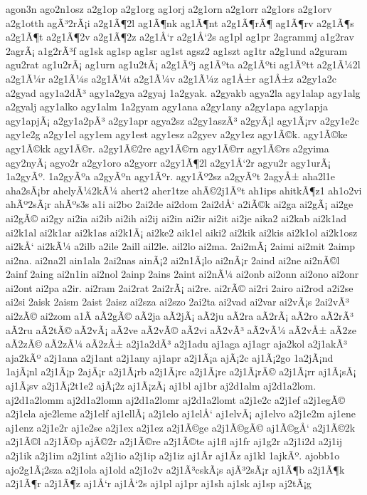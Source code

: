 {agon3n
ago2n1osz
a2g1op
a2g1org
ag1orj
a2g1orn
a2g1orr
a2g1ors
a2g1orv
a2g1otth
agÃ³2rÃ¡i
a2g1Ã¶2l
ag1Ã¶nk
ag1Ã¶nt
a2g1Ã¶rÃ¶
ag1Ã¶rv
a2g1Ã¶s
a2g1Ã¶t
a2g1Ã¶2v
a2g1Ã¶2z
a2g1Å‘r
a2g1Å‘2s
ag1pl
ag1pr
2agrammj
a1g2rav
2agrÃ¡
a1g2rÃ³f
ag1sk
ag1sp
ag1sr
ag1st
agsz2
ag1szt
ag1tr
a2g1und
a2guram
agu2rat
ag1u2rÃ¡
ag1urn
ag1u2tÃ¡
a2g1Ãºj
ag1Ãºta
a2g1Ãºti
ag1Ãºtt
a2g1Ã¼2l
a2g1Ã¼r
a2g1Ã¼s
a2g1Ã¼t
a2g1Ã¼v
a2g1Ã¼z
ag1Å±r
ag1Å±z
a2gy1a2c
a2gyad
agy1a2dÃ³
agy1a2gya
a2gyaj
1a2gyak.
a2gyakb
agya2la
agy1alap
agy1alg
a2gyalj
agy1alko
agy1alm
1a2gyam
agy1ana
a2gy1any
a2gy1apa
agy1apja
agy1apjÃ¡
a2gy1a2pÃ³
a2gy1apr
agya2sz
a2gy1aszÃ³
a2gyÃ¡l
agy1Ã¡rv
a2gy1e2c
agy1e2g
a2gy1el
agy1em
agy1est
agy1esz
a2gyev
a2gy1ez
agy1Ã©k.
agy1Ã©ke
agy1Ã©kk
agy1Ã©r.
a2gy1Ã©2re
agy1Ã©rn
agy1Ã©rr
agy1Ã©rs
a2gyima
agy2nyÃ¡
agyo2r
a2gy1oro
a2gyorr
a2gy1Ã¶2l
a2gy1Å‘2r
agyu2r
agy1urÃ¡
1a2gyÃº.
1a2gyÃºa
a2gyÃºn
agy1Ãºr.
agy1Ãº2sz
a2gyÃºt
2agyÅ±
aha2l1e
aha2sÃ¡br
ahelyÃ¼2kÃ¼
ahert2
aher1tze
ahÃ©2j1Ãºt
ah1ips
ahitkÃ¶z1
ah1o2vi
ahÃº2sÃ¡r
ahÃºs3s
a1i
ai2bo
2ai2de
ai2dom
2ai2dÅ‘
a2iÃ©k
ai2ga
ai2gÃ¡
ai2ge
ai2gÃ©
ai2gy
ai2ia
ai2ib
ai2ih
ai2ij
ai2in
ai2ir
ai2it
ai2je
aika2
ai2kab
ai2k1ad
ai2k1al
ai2k1ar
ai2k1as
ai2k1Ã¡
ai2ke2
aik1el
aiki2
ai2kik
ai2kis
ai2k1ol
ai2k1osz
ai2kÅ‘
ai2kÃ¼
a2ilb
a2ile
2aill
ail2le.
ail2lo
ai2ma.
2ai2mÃ¡
2aimi
ai2mit
2aimp
ai2na.
ai2na2l
ain1ala
2ai2nas
ainÃ¡2
ai2n1Ã¡lo
ai2nÃ¡r
2aind
ai2ne
ai2nÃ©l
2ainf
2aing
ai2n1in
ai2nol
2ainp
2ains
2aint
ai2nÃ¼
ai2onb
ai2onn
ai2ono
ai2onr
ai2ont
ai2pa
a2ir.
ai2ram
2ai2rat
2ai2rÃ¡
ai2re.
ai2rÃ©
ai2ri
2airo
ai2rod
a2i2se
ai2si
2aisk
2aism
2aist
2aisz
ai2sza
ai2szo
2ai2ta
ai2vad
ai2var
ai2vÃ¡s
2ai2vÃ³
ai2zÃ©
ai2zom
a1Ã­
aÃ­2gÃ©
aÃ­2ja
aÃ­2jÃ¡
aÃ­2ju
aÃ­2ra
aÃ­2rÃ¡
aÃ­2ro
aÃ­2rÃ³
aÃ­2ru
aÃ­2tÃ©
aÃ­2vÃ¡
aÃ­2ve
aÃ­2vÃ©
aÃ­2vi
aÃ­2vÃ³
aÃ­2vÃ¼
aÃ­2vÅ±
aÃ­2ze
aÃ­2zÃ©
aÃ­2zÃ¼
aÃ­2zÅ±
a2j1a2dÃ³
a2j1adu
aj1aga
aj1agr
aja2kol
a2j1akÃ³
aja2kÃº
a2j1ana
a2j1ant
a2j1any
aj1apr
a2j1Ã¡a
ajÃ¡2c
aj1Ã¡2go
1a2jÃ¡nd
1ajÃ¡nl
a2j1Ã¡p
2ajÃ¡r
a2j1Ã¡rb
a2j1Ã¡rc
a2j1Ã¡re
a2j1Ã¡rÃ©
a2j1Ã¡rr
aj1Ã¡sÃ¡
aj1Ã¡sv
a2j1Ã¡2t1e2
ajÃ¡2z
aj1Ã¡zÃ¡
aj1bl
aj1br
aj2d1alm
aj2d1a2lom.
aj2d1a2lomm
aj2d1a2lomn
aj2d1a2lomr
aj2d1a2lomt
a2j1e2c
a2j1ef
a2j1egÃ©
a2j1ela
aje2leme
a2j1elf
aj1ellÃ¡
a2j1elo
aj1elÅ‘
aj1elvÃ¡
aj1elvo
a2j1e2m
aj1ene
aj1enz
a2j1e2r
aj1e2se
a2j1ex
a2j1ez
a2j1Ã©ge
a2j1Ã©gÃ©
aj1Ã©gÅ‘
a2j1Ã©2k
a2j1Ã©l
a2j1Ã©p
ajÃ©2r
a2j1Ã©re
a2j1Ã©te
aj1fl
aj1fr
aj1g2r
a2j1i2d
a2j1ij
a2j1ik
a2j1im
a2j1int
a2j1io
a2j1ip
a2j1iz
aj1Ã­r
aj1Ã­z
aj1kl
1ajkÃº.
ajobb1o
ajo2g1Ã¡2sza
a2j1ola
aj1old
a2j1o2v
a2j1Ã³cskÃ¡s
ajÃ³2sÃ¡r
aj1Ã¶b
a2j1Ã¶k
a2j1Ã¶r
a2j1Ã¶z
aj1Å‘r
aj1Å‘2s
aj1pl
aj1pr
aj1sh
aj1sk
aj1sp
aj2tÃ¡g
}
